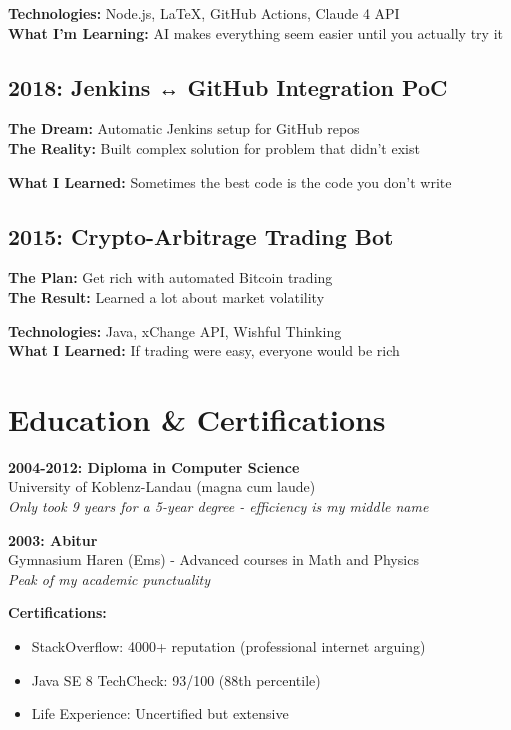 \documentclass[11pt,a4paper]{article}
\begin{document}
\textbf{Technologies:} Node.js, LaTeX, GitHub Actions, Claude 4 API\\
\textbf{What I'm Learning:} AI makes everything seem easier until you actually try it

\subsection{2018: Jenkins ↔ GitHub Integration PoC}
\textbf{The Dream:} Automatic Jenkins setup for GitHub repos\\
\textbf{The Reality:} Built complex solution for problem that didn't exist

\textbf{What I Learned:} Sometimes the best code is the code you don't write

\subsection{2015: Crypto-Arbitrage Trading Bot}
\textbf{The Plan:} Get rich with automated Bitcoin trading\\
\textbf{The Result:} Learned a lot about market volatility

\textbf{Technologies:} Java, xChange API, Wishful Thinking\\
\textbf{What I Learned:} If trading were easy, everyone would be rich

\section{Education \& Certifications}

\textbf{2004-2012: Diploma in Computer Science}\\
University of Koblenz-Landau (magna cum laude)\\
\textit{Only took 9 years for a 5-year degree - efficiency is my middle name}

\textbf{2003: Abitur}\\
Gymnasium Haren (Ems) - Advanced courses in Math and Physics\\
\textit{Peak of my academic punctuality}

\textbf{Certifications:}
\begin{itemize}[leftmargin=1.5em, itemsep=0.1em]
\item StackOverflow: 4000+ reputation (professional internet arguing)
\item Java SE 8 TechCheck: 93/100 (88th percentile)
\item Life Experience: Uncertified but extensive
\end{itemize}
\end{document}
